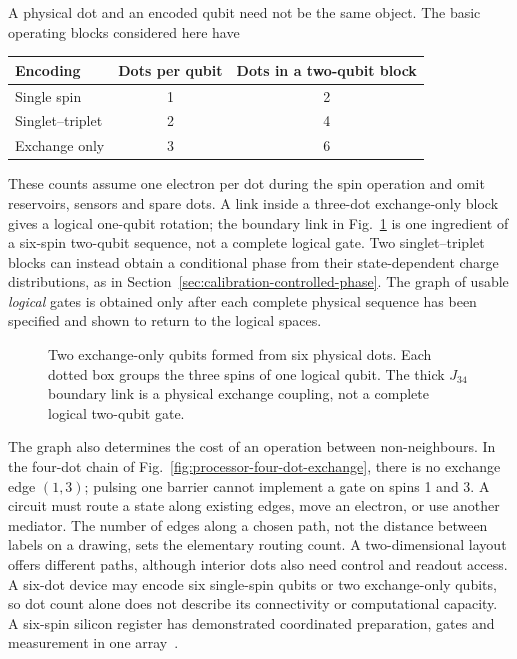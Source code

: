 A physical dot and an encoded qubit need not be the same object.
The basic operating blocks considered here have
\begin{center}
\begin{tabular}{lcc}
\hline
Encoding & Dots per qubit & Dots in a two-qubit block\\
\hline
Single spin & 1 & 2\\
Singlet--triplet & 2 & 4\\
Exchange only & 3 & 6\\
\hline
\end{tabular}
\end{center}
These counts assume one electron per dot during the spin operation
and omit reservoirs, sensors and spare dots. A link inside a
three-dot exchange-only block gives a logical one-qubit rotation;
the boundary link in
Fig.~\ref{fig:processor-exchange-only-blocks} is one ingredient
of a six-spin two-qubit sequence, not a complete logical gate. Two
singlet--triplet blocks can instead obtain a conditional phase
from their state-dependent charge distributions, as in
Section~\ref{sec:calibration-controlled-phase}. The graph of
usable \emph{logical} gates is obtained only after each complete
physical sequence has been specified and shown to return to the
logical spaces.

\begin{figure}[htbp]
 \centering
 \caption{Two exchange-only qubits formed from six physical dots.
 Each dotted box groups the three spins of one logical qubit.
 The thick \(J_{34}\) boundary link is a physical exchange coupling,
 not a complete logical two-qubit gate.}
 \label{fig:processor-exchange-only-blocks}
\end{figure}
\FloatBarrier

The graph also determines the cost of an operation between
non-neighbours. In the four-dot chain of
Fig.~\ref{fig:processor-four-dot-exchange}, there is no
exchange edge
\((1,3)\); pulsing one barrier cannot implement a gate on spins
1 and 3. A circuit must route a state along existing edges,
move an electron, or use another mediator. The number of edges
along a chosen path, not the distance between labels on a drawing,
sets the elementary routing count. A two-dimensional
layout offers different paths, although interior dots also need
control and readout access. A six-dot device may encode six
single-spin qubits or two exchange-only qubits, so dot count alone
does not describe its connectivity or computational capacity.
A six-spin silicon register has demonstrated coordinated
preparation, gates and measurement in one array~\cite{Philips2022}.

